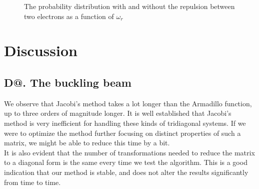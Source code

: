\documentclass[%
reprint,
amsmath,amssymb,
aps,
]{revtex4-1}
\makeatletter
\newcommand*{\rom}[1]{\expandafter\@slowromancap\romannumeral #1@}
\makeatother
\begin{document}
\begin{figure}
	\caption{The probability distribution with and without the repulsion between two electrons as a function of $\omega_r$} \label{wavefunc}
\end{figure}

\section*{Discussion} 
\subsection*{D\rom{1}. The buckling beam}
We observe that Jacobi's method takes a lot longer than the Armadillo function, up to three orders of magnitude longer. It is well established that Jacobi's method is very inefficient for handling these kinds of tridiagonal systems. If we were to optimize the method further focusing on distinct properties of such a matrix, we might be able to reduce this time by a bit. \\ \indent 
It is also evident that the number of transformations needed to reduce the matrix to a diagonal form is the same every time we test the algorithm. This is a good indication that our method is stable, and does not alter the results significantly from time to time.  
\end{document}
